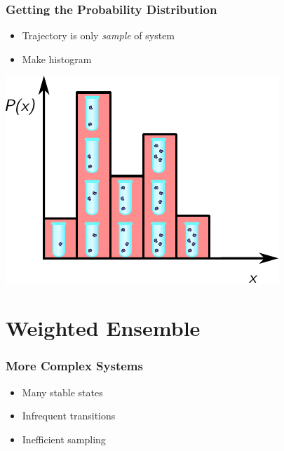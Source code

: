 \documentclass[xcolor={usenames,dvipsnames,svgnames},url=hyphens]{beamer}
\begin{document}
\begin{frame}
    \frametitle{Getting the Probability Distribution}
    \begin{itemize}
        \item Trajectory is only \emph{sample} of system
        \item Make histogram
    \end{itemize}
    \begin{center}
        \includegraphics{figures/histogram-illustration.pdf}
    \end{center}
\end{frame}


\section{Weighted Ensemble} %
\label{sec:resampling}

\begin{frame}
    \frametitle{More Complex Systems}
    \begin{center}
        
    \end{center}

    \begin{itemize}
        \item Many stable states
        \item Infrequent transitions
        \item Inefficient sampling
    \end{itemize}
\end{frame}
\end{document}
